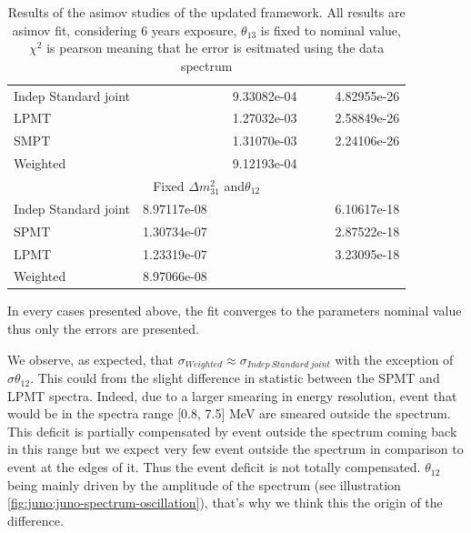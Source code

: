 \documentclass[../main.tex]{subfiles}
\begin{document}
\begin{table}[ht]
\begin{footnotesize}
\begin{tabular}{l | c | c | c | c | c | c }
  Indep Standard joint &               &               & 9.33082e-04   &               &               & 4.82955e-26 \\
  LPMT                 &               &               & 1.27032e-03   &               &               & 2.58849e-26 \\
  SMPT                 &               &               & 1.31070e-03   &               &               & 2.24106e-26 \\
  Weighted             &               &               & 9.12193e-04   &               &               & \\
  \hline
  \hline
  \multicolumn{7}{c}{Fixed $\Delta m^2_{31}$ and$\theta_{12}$} \\
  \hline
  Indep Standard joint          & 8.97117e-08   &               &               &               &               & 6.10617e-18 \\
  SPMT                          & 1.30734e-07   &               &               &               &               & 2.87522e-18 \\
  LPMT                          & 1.23319e-07   &               &               &               &               & 3.23095e-18 \\
  Weighted                      & 8.97066e-08   &               &               &               &               & \\
  \end{tabular}
  \end{footnotesize}
  \caption{Results of the asimov studies of the updated framework. All results are asimov fit, considering 6 years exposure, $\theta_{13}$ is fixed to nominal value, $\chi^2$ is pearson meaning that he error is esitmated using the data spectrum}
  \label{tab:joint_fit:asimov_results}

\end{table}

In every cases presented above, the fit converges to the parameters nominal value thus only the errors are presented.

We observe, as expected, that $\sigma_{Weighted} \approx \sigma_{Indep~Standard~joint}$ with the exception of $\sigma \theta_{12}$. This could from the slight difference in statistic between the SPMT and LPMT spectra. Indeed, due to a larger smearing in energy resolution, event that would be in the spectra range [0.8, 7.5] MeV are smeared outside the spectrum. This deficit is partially compensated by event outside the spectrum coming back in this range but we expect very few event outside the spectrum in comparison to event at the edges of it. Thus the event deficit is not totally compensated. $\theta_{12}$ being mainly driven by the amplitude of the spectrum (see illustration \ref{fig:juno:juno-spectrum-oscillation}), that's why we think this the origin of the difference.
\end{document}
